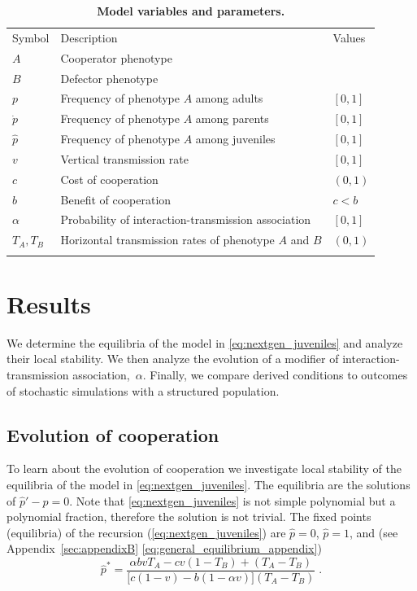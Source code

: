 \documentclass[12pt]{extarticle}
\begin{document}
\begin{table}[h]
\centering
\caption{\textbf{Model variables and parameters.}
}
\begin{tabular}{lll}
\toprule
Symbol & Description & Values \\ \cmidrule(r){1-3}
$A$ & Cooperator phenotype & \\
$B$ & Defector phenotype & \\
$p$ & Frequency of phenotype $A$ among adults & $[0,1]$ \\
$\dot p$ & Frequency of phenotype $A$ among parents & $[0,1]$ \\
$\hat p$ & Frequency of phenotype $A$ among juveniles & $[0,1]$ \\
$v$ & Vertical transmission rate & $[0,1]$ \\
$c$ & Cost of cooperation & $(0,1)$ \\
$b$ & Benefit of cooperation & $c<b$ \\
$\alpha$ & Probability of interaction-transmission association & $[0,1]$ \\
$T_A, T_B$ & Horizontal transmission rates of phenotype $A$ and $B$ & $(0,1)$ \\
\\ \bottomrule
\end{tabular}
\label{table:vars_params}
\end{table}


\newpage
\section{Results}

We determine the equilibria of the model in \autoref{eq:nextgen_juveniles}
and analyze their local stability.
We then analyze the evolution of a modifier of interaction-transmission association,~$\alpha$.
Finally, we compare derived conditions to outcomes of stochastic simulations with a structured population.

\subsection{Evolution of cooperation}

To learn about the evolution of cooperation we investigate local stability of the equilibria of the model in \autoref{eq:nextgen_juveniles}.
The equilibria are the solutions of $\hat{p}'-\hat{p}=0$. Note that \autoref{eq:nextgen_juveniles} is not simple polynomial but a polynomial fraction, therefore the solution is not trivial.
The fixed points (equilibria) of the recursion (\autoref{eq:nextgen_juveniles}) are $\hat p=0$, $\hat p=1$, and (see Appendix~\ref{sec:appendixB} \autoref{eq:general_equilibrium_appendix})
\begin{equation} \label{eq:general_equilibrium}
  \hat{p}^* =  
  \frac{\alpha bvT_A - cv(1-T_B) + (T_A-T_B)}{\big[c(1-v) - b (1-\alpha v)\big] (T_A-T_B)} \;.
\end{equation}
\end{document}
